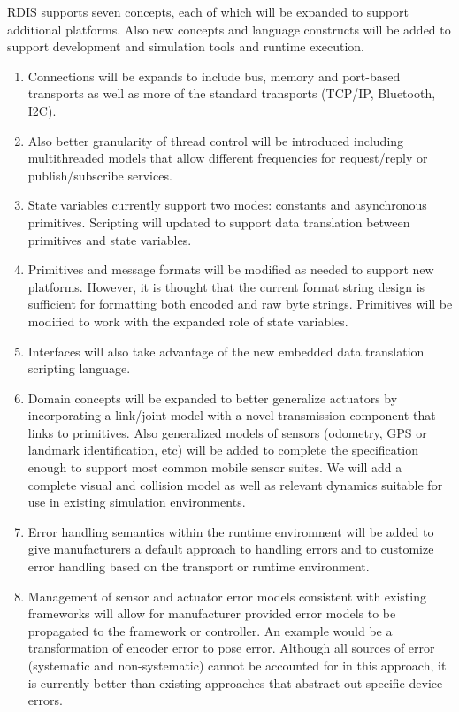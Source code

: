 RDIS supports seven concepts, each of which will be expanded to support additional platforms.  Also new concepts and language constructs will be added to support development and simulation tools and runtime execution.
%
\begin{enumerate}
  \item Connections will be expands to include bus, memory and port-based transports as well as more of the standard transports (TCP/IP, Bluetooth, I2C).
  \item Also better granularity of thread control will be introduced including multithreaded models that allow different frequencies for request/reply or publish/subscribe services.
  \item State variables currently support two modes: constants and asynchronous primitives.  Scripting will updated to support data translation between primitives and state variables.
  \item Primitives and message formats will be modified as needed to support new platforms.  However, it is thought that the current format string design is sufficient for formatting both encoded and raw byte strings.  Primitives will be modified to work with the expanded role of state variables.
  \item Interfaces will also take advantage of the new embedded data translation scripting language.
  \item Domain concepts will be expanded to better generalize actuators by incorporating a link/joint model with a novel transmission component that links to primitives.  Also generalized models of sensors (odometry, GPS or landmark identification, etc) will be added to complete the specification enough to support most common mobile sensor suites.  We will add a complete visual and collision model as well as relevant dynamics suitable for use in existing simulation environments.
  \item Error handling semantics within the runtime environment will be added to give manufacturers a default approach to handling errors and to customize error handling based on the transport or runtime environment.
  \item Management of sensor and actuator error models consistent with existing frameworks will allow for manufacturer provided error models to be propagated to the framework or controller.  An example would be a transformation of encoder error to pose error.  Although all sources of error (systematic and non-systematic) cannot be accounted for in this approach, it is currently better than existing approaches that abstract out specific device errors.
\end{enumerate}

